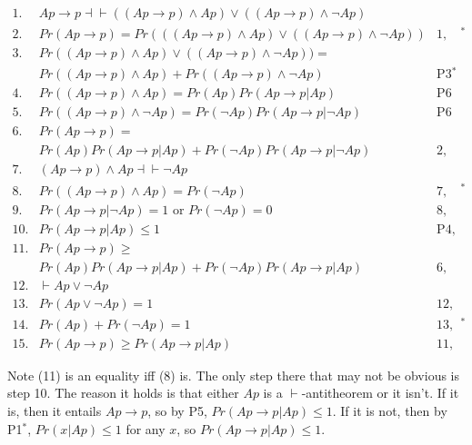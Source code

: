 \documentclass[
  11pt,
  letterpaper,
  DIV=11,
  numbers=noendperiod,
  oneside]{scrartcl}
\begin{document}
\[
\begin{aligned}
1. &Ap \rightarrow p \dashv \vdash ((Ap \rightarrow p) \wedge Ap) \vee ((Ap \rightarrow p) \wedge \neg Ap) & \text{} \\
2. &Pr(Ap \rightarrow p) = Pr(((Ap \rightarrow p) \wedge Ap) \vee ((Ap \rightarrow p) \wedge \neg Ap)) & \text{1, P2$^*$} \\
3. & Pr ((Ap \rightarrow p) \wedge Ap) \vee ((Ap \rightarrow p) \wedge \neg Ap)) = \\&Pr ((Ap \rightarrow p) \wedge Ap) + Pr ((Ap \rightarrow p) \wedge \neg Ap)  
 & \text{P3$^*$}  \\
4. &Pr((Ap \rightarrow p) \wedge Ap) = Pr (Ap)Pr(Ap \rightarrow p|Ap) & \text{P6} \\
5. &Pr((Ap \rightarrow p) \wedge \neg Ap) = Pr(\neg Ap)Pr(Ap \rightarrow p |\neg Ap) & \text{P6} \\
6. &Pr(Ap \rightarrow p) = \\&Pr(Ap)Pr(Ap \rightarrow p|Ap) + Pr (\neg Ap)Pr(Ap \rightarrow p |\neg Ap) & \text{2, 4, 5} \\
7. &(Ap \rightarrow p) \wedge Ap \dashv \vdash \neg Ap & \text{} \\
8. &Pr((Ap \rightarrow p) \wedge Ap) = Pr(\neg Ap) & \text{7, P2$^*$} \\
9. &Pr(Ap \rightarrow p |\neg Ap) = 1 \text{ or } Pr(\neg Ap) = 0 & \text{8, P6}  \\
10. &Pr(Ap \rightarrow p | Ap) \leq 1 & \text{P4, P5} \\
11. &Pr(Ap \rightarrow p) \geq \\ &Pr(Ap)Pr(Ap \rightarrow p|Ap) + Pr (\neg Ap)Pr(Ap \rightarrow p |Ap)  & \text{6, 9, 10} \\
12. &\vdash Ap \vee \neg Ap & \text{} \\
13. &Pr(Ap \vee \neg Ap) = 1 & \text{12, P1} \\
14. &Pr(Ap) + Pr (\neg Ap) = 1 & \text{13, P3$^*$} \\
15. &Pr(Ap \rightarrow p ) \geq Pr (Ap \rightarrow p|Ap) & \text{11, 14} 
\end{aligned}
\]

Note (11) is an equality iff (8) is. The only step there that may not be
obvious is step 10. The reason it holds is that either \(Ap\) is a
\(\vdash\)-antitheorem or it isn't. If it is, then it entails
\(Ap \rightarrow p\), so by P5, \(Pr(Ap \rightarrow p | Ap) \leq 1\). If
it is not, then by P1\(^*\), \(Pr(x | Ap) \leq 1\) for any \(x\), so
\(Pr(Ap \rightarrow p | Ap) \leq 1\).
\end{document}
